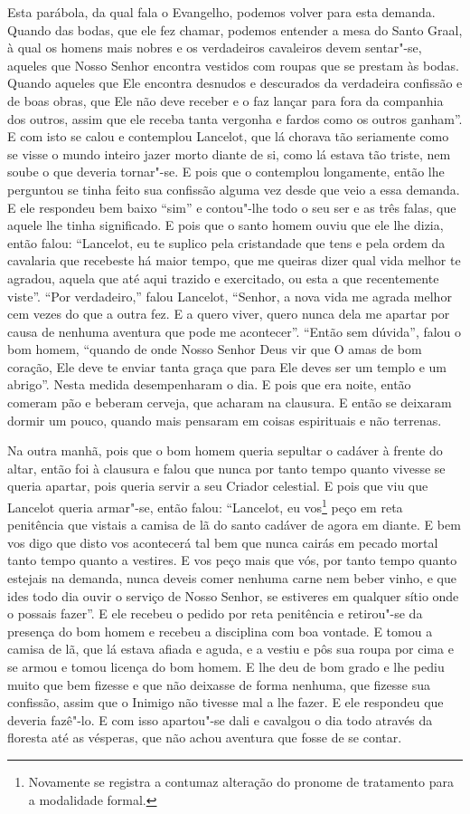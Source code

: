 Esta parábola, da qual fala o Evangelho, podemos volver para esta demanda.
Quando das bodas, que ele fez chamar, podemos entender a mesa do Santo Graal, à
qual os homens mais nobres e os verdadeiros cavaleiros devem sentar"-se, aqueles
que Nosso Senhor encontra vestidos com roupas que se prestam às bodas. Quando
aqueles que Ele encontra desnudos e descurados da verdadeira confissão e de
boas obras, que Ele não deve receber e o faz lançar para fora da companhia dos
outros, assim que ele receba tanta vergonha e fardos como os outros ganham”.  E
com isto se calou e contemplou Lancelot, que lá chorava tão seriamente como se
visse o mundo inteiro jazer morto diante de si, como lá estava tão triste, nem
soube o que deveria tornar"-se. E pois que o contemplou longamente, então lhe
perguntou se tinha feito sua confissão alguma vez desde que veio a essa
demanda. E ele respondeu bem baixo “sim” e contou"-lhe todo o seu ser e as três
falas, que aquele lhe tinha significado. E pois que o santo homem ouviu que ele
lhe dizia, então falou: “Lancelot, eu te suplico pela cristandade que tens e
pela ordem da cavalaria que recebeste há maior tempo, que me queiras dizer qual
vida melhor te agradou, aquela que até aqui trazido e exercitado, ou esta a que
recentemente viste”. “Por verdadeiro,” falou Lancelot, “Senhor, a nova vida me
agrada melhor cem vezes do que a outra fez. E a quero viver, quero nunca dela
me apartar por causa de nenhuma aventura que pode me acontecer”. “Então sem
dúvida”, falou o bom homem, ``quando de onde Nosso Senhor Deus vir que O amas de
bom coração, Ele deve te enviar tanta graça  que para Ele deves ser um templo e
um abrigo”. Nesta medida desempenharam o dia. E pois que era
noite, então comeram pão e beberam cerveja, que acharam na clausura. E
então se deixaram dormir um pouco, quando mais pensaram em coisas espirituais e
não terrenas.

Na outra manhã, pois que o bom homem queria sepultar o cadáver à frente do
altar, então foi à clausura e falou que nunca por tanto tempo quanto vivesse se
queria apartar, pois queria servir a seu Criador celestial. E pois que viu que
Lancelot queria armar"-se, então falou: “Lancelot, eu vos\footnote{ Novamente
se registra a contumaz alteração do pronome de tratamento para a modalidade
formal.} peço em reta penitência que vistais a camisa de lã do
santo cadáver de agora em diante. E bem vos digo que disto vos acontecerá tal
bem que nunca cairás em pecado mortal tanto tempo quanto a vestires. E vos peço
mais que vós, por tanto tempo quanto estejais na demanda, nunca deveis comer
nenhuma carne nem beber vinho, e que ides todo dia ouvir o serviço de Nosso
Senhor,  se estiveres em qualquer sítio onde o possais fazer”. E ele
recebeu o pedido por reta penitência e retirou"-se da presença do bom homem e
recebeu a disciplina com boa vontade. E tomou a camisa de lã, que lá estava
afiada e aguda, e a vestiu e pôs sua roupa por cima e se armou e tomou licença
do bom homem. E lhe deu de bom grado e lhe pediu muito que bem fizesse e que
não deixasse de forma nenhuma, que fizesse sua confissão, assim que o Inimigo
não tivesse mal a lhe fazer. E ele respondeu que deveria fazê"-lo. E com isso
apartou"-se dali e cavalgou o dia todo através da floresta até as vésperas, que
não achou aventura que fosse de se contar. 

